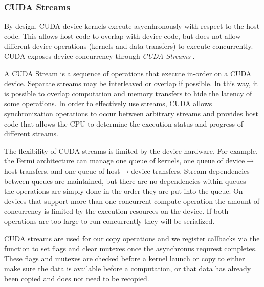 
\subsubsection{CUDA Streams}
By design, CUDA device kernels execute asycnhronously with respect to the
host code. This allows host code to overlap with device code, but does not
allow different device operations (kernels and data transfers) to execute
concurrently. CUDA exposes device concurrency through \textit{CUDA Streams}
\cite{kirk2012programming}.

A CUDA Stream is a sequence of operations that
execute in-order on a CUDA device. Separate streams may be interleaved or
overlap if possible. In this way, it is possible to overlap computation and
memory transfers to hide the latency of some operations.
In order to effectively use streams, CUDA allows synchronization operations
to occur between arbitrary streams and provides host code that allows the
CPU to determine the execution status and progress of different streams.

The flexibility of CUDA streams is limited by the device hardware.
For example, the Fermi architecture can manage one queue of kernels, one queue
of device$\rightarrow$host transfers, and one queue of host$\rightarrow$device
transfers. Stream
dependencies between queues are maintained, but there are no dependencies
within queues - the operations are simply done in the order they are put into
the queue.
On devices that support more than one concurrent compute operation the amount
of concurrency is limited by the execution resources on the device. If both
operations are too large to run concurrently they will be serialized.


CUDA streams are used for our copy operations and we register callbacks via the  function to set flags and clear mutexes once
the asynchronus requrest completes.
These flags and mutexes are checked before a kernel launch or copy to either	make sure the data is available before a computation, or that data has
	already been copied and does not need to be recopied.

	
